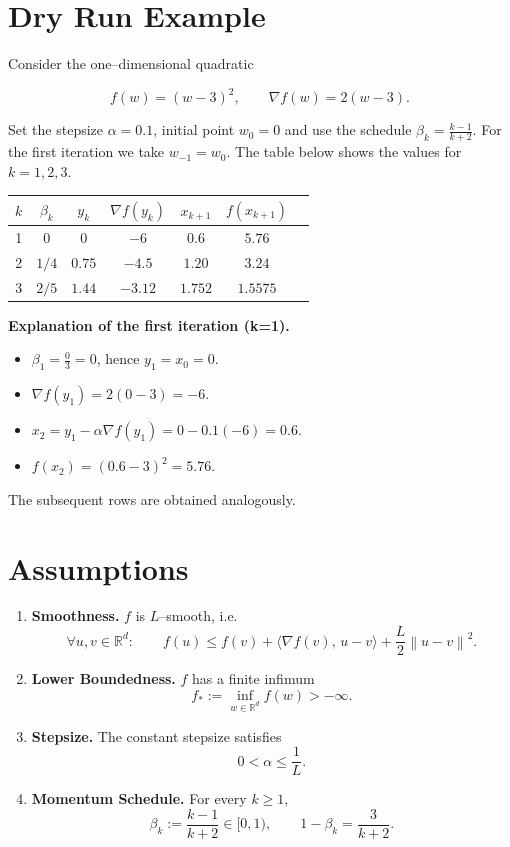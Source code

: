 \documentclass{article}
\newcommand{\norm}[1]{\left\lVert#1\right\rVert}
\newcommand{\grad}{\nabla}
\begin{document}
\section*{Dry Run Example}
Consider the one–dimensional quadratic  

\[
f(w)=(w-3)^2 ,\qquad \grad f(w)=2(w-3).
\]

Set the stepsize $\alpha=0.1$, initial point $w_0=0$ and use the schedule
$\beta_k=\frac{k-1}{k+2}$.  For the first iteration we take $w_{-1}=w_0$.
The table below shows the values for $k=1,2,3$.

\begin{center}
\begin{tabular}{ccccccc}
\toprule
$k$ & $\beta_k$ & $y_k$ & $\grad f(y_k)$ & $x_{k+1}$ & $f(x_{k+1})$ \\
\midrule
1 & $0$      & $0$   & $-6$          & $0.6$     & $5.76$      \\
2 & $1/4$    & $0.75$& $-4.5$        & $1.20$    & $3.24$      \\
3 & $2/5$    & $1.44$& $-3.12$       & $1.752$   & $1.5575$    \\
\bottomrule
\end{tabular}
\end{center}

\noindent\textbf{Explanation of the first iteration (k=1).}\\
\begin{itemize}
\item $\beta_1=\frac{0}{3}=0$, hence $y_1=x_0=0$.
\item $\grad f(y_1)=2(0-3)=-6$.
\item $x_{2}=y_1-\alpha\grad f(y_1)=0-0.1(-6)=0.6$.
\item $f(x_{2})=(0.6-3)^2=5.76$.
\end{itemize}
The subsequent rows are obtained analogously.

\section*{Assumptions}
\begin{enumerate}[label={A\arabic*}:, leftmargin=*]
\item \textbf{Smoothness.} $f$ is $L$–smooth, i.e.
\[
\forall u,v\in\mathbb{R}^d:\qquad
f(u)\le f(v)+\langle\grad f(v),\,u-v\rangle+\frac{L}{2}\norm{u-v}^2 .
\tag{A1}
\]
\item \textbf{Lower Boundedness.} $f$ has a finite infimum
\[
f_*:=\inf_{w\in\mathbb{R}^d}f(w)>-\infty .
\tag{A2}
\]
\item \textbf{Stepsize.} The constant stepsize satisfies
\[
0<\alpha\le \frac{1}{L}.
\tag{A3}
\]
\item \textbf{Momentum Schedule.} For every $k\ge 1$,
\[
\beta_k:=\frac{k-1}{k+2}\in[0,1),
\qquad
1-\beta_k=\frac{3}{k+2}.
\tag{A4}
\]
\end{enumerate}
\end{document}
